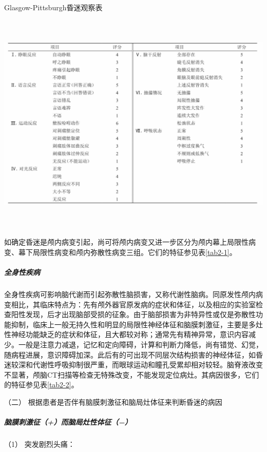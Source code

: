 \begin{table}[htbp]
\centering
\caption{Glasgow-Pittsburgh昏迷观察表}
\label{tab2-4}
\includegraphics[width=6.69792in,height=4.21875in]{./images/Image00007.jpg}
\end{table}

如确定昏迷是颅内病变引起，尚可将颅内病变又进一步区分为颅内幕上局限性病变、幕下局限性病变和颅内弥散性病变三组。它们的特征参见表\ref{tab2-1}。

\subparagraph{全身性疾病}

全身性疾病可影响脑代谢而引起弥散性脑损害，又称代谢性脑病。同原发性颅内病变相比，其临床特点为：先有颅外器官原发病的症状和体征，以及相应的实验室检查阳性发现，后才出现脑部受损的征象。由于脑部损害为非特异性或仅是弥散性功能抑制，临床上一般无持久性和明显的局限性神经体征和脑膜刺激征，主要是多灶性神经功能缺乏的症状和体征，且大都较对称；通常先有精神异常，意识内容减少。一般是注意力减退，记忆和定向障碍，计算和判断力降低，尚有错觉、幻觉，随病程进展，意识障碍加深。此后有的可出现不同层次结构损害的神经体征，如昏迷较深和代谢性呼吸抑制很严重，而眼球运动和瞳孔受累却相对较轻。脑脊液改变不显著，颅脑CT扫描等检查无特殊改变，不能发现定位病灶。其病因很多，它们的特征参见表\ref{tab2-2}。

\hypertarget{text00010.htmlux5cux23CHP1-2-2-4-2}{}
（二） 根据患者是否伴有脑膜刺激征和脑局灶体征来判断昏迷的病因

\subparagraph{脑膜刺激征（+）而脑局灶性体征（−）}

\hypertarget{text00010.htmlux5cux23CHP1-2-2-4-2-1-1}{}
（1） 突发剧烈头痛：

